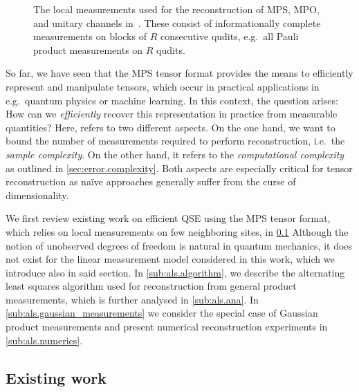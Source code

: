 \begin{figure*}
  \centering
  
  \caption{%
    The local measurements used for the reconstruction of MPS, MPO, and unitary channels in~\cite{Cramer_2010_Efficient,Baumgratz_2013_Scalable,Baumgratz_2013_Scalablea,Lanyon_2017_Efficient,Holzaepfel_2014_Scalable}.
    These consist of informationally complete measurements on blocks of $R$ consecutive qudits, e.g.\ all Pauli product measurements on $R$ qudits.
    }%
  \label{fig:als.quantum_measurements}
\end{figure*}

So far, we have seen that the MPS tensor format provides the means to efficiently represent and manipulate tensors, which occur in practical applications in e.g.\ quantum physics or machine learning.
In this context, the question arises: How can we \emph{efficiently} recover this representation in practice from measurable quantities?
Here,  refers to two different aspects.
On the one hand, we want to bound the number of measurements required to perform reconstruction, i.e.\ the \emph{sample complexity}.
On the other hand, it refers to the \emph{computational complexity} as outlined in \cref{sec:error.complexity}.
Both aspects are especially critical for tensor reconstruction as na\"ive approaches generally suffer from the curse of dimensionality.

We first review existing work on efficient QSE using the MPS tensor format, which relies on local measurements on few neighboring sites, in \cref{sub:als.existing}
Although the notion of  unobserved degrees of freedom is natural in quantum mechanics, it does not exist for the linear measurement model considered in this work, which we introduce also in said section.
In \cref{sub:als.algorithm}, we describe the alternating least squares algorithm used for reconstruction from general product measurements, which is further analysed in \cref{sub:als.ana}.
In \cref{sub:als.gaussian_measurements} we consider the special case of Gaussian product measurements and present numerical reconstruction experiments in \cref{sub:als.numerics}.


\subsection{Existing work}%
\label{sub:als.existing}


